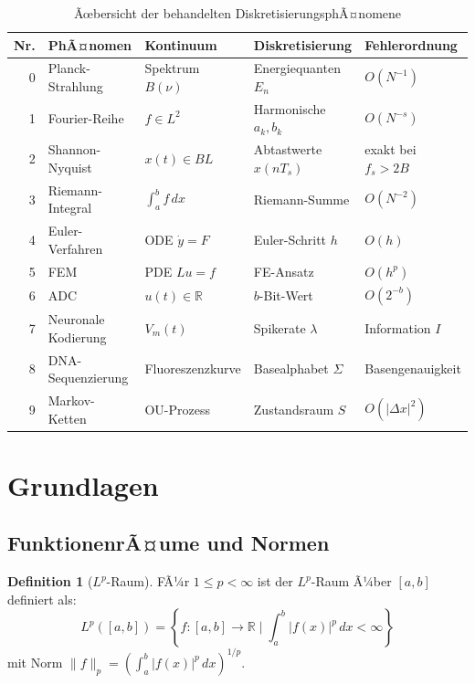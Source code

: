 ﻿\documentclass[a4paper,12pt]{article}
\theoremstyle{definition}
\newtheorem{definition}{Definition}
\begin{document}
\begin{table}[h]
\centering
\begin{tabular}{rllll}
\toprule
\textbf{Nr.} & \textbf{PhÃ¤nomen} & \textbf{Kontinuum} & \textbf{Diskretisierung} & \textbf{Fehlerordnung}\\
\midrule
0 & Planck-Strahlung & Spektrum $B(\nu)$ & Energiequanten $E_n$ & $O(N^{-1})$\\
1 & Fourier-Reihe & $f \in L^2$ & Harmonische $a_k, b_k$ & $O(N^{-s})$\\
2 & Shannon-Nyquist & $x(t) \in BL$ & Abtastwerte $x(nT_s)$ & exakt bei $f_s > 2B$\\
3 & Riemann-Integral & $\int_a^b f\,dx$ & Riemann-Summe & $O(N^{-2})$\\
4 & Euler-Verfahren & ODE $\dot{y}=F$ & Euler-Schritt $h$ & $O(h)$\\
5 & FEM & PDE $Lu=f$ & FE-Ansatz & $O(h^p)$\\
6 & ADC & $u(t)\in\mathbb{R}$ & $b$-Bit-Wert & $O(2^{-b})$\\
7 & Neuronale Kodierung & $V_m(t)$ & Spikerate $\lambda$ & Information $I$\\
8 & DNA-Sequenzierung & Fluoreszenzkurve & Basealphabet $\Sigma$ & Basengenauigkeit\\
9 & Markov-Ketten & OU-Prozess & Zustandsraum $S$ & $O(|\Delta x|^2)$\\
\bottomrule
\end{tabular}
\caption{Ãœbersicht der behandelten DiskretisierungsphÃ¤nomene}
\end{table}

\section{Grundlagen}

\subsection{FunktionenrÃ¤ume und Normen}

\begin{definition}[$L^p$-Raum]
    FÃ¼r $1 \leq p < \infty$ ist der $L^p$-Raum Ã¼ber $[a,b]$ definiert als:
    \[
    L^p([a,b]) = \left\{ f : [a,b] \to \mathbb{R} \;\Big|\; \int_a^b |f(x)|^p\,dx < \infty \right\}
    \]
    mit Norm $\|f\|_p = \left(\int_a^b |f(x)|^p\,dx\right)^{1/p}$.
\end{definition}
\end{document}
